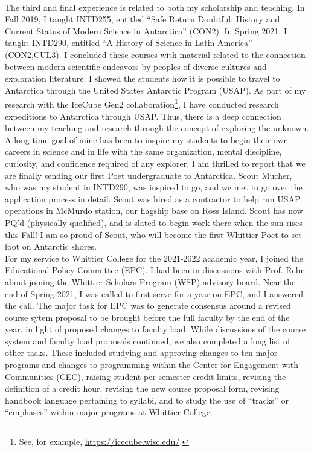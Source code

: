 \documentclass[../../main.tex]{subfiles}
\begin{document}
\\
\vspace{0.25cm}
The third and final experience is related to both my scholarship and teaching.  In Fall 2019, I taught INTD255, entitled ``Safe Return Doubtful: History and Current Status of Modern Science in Antarctica'' (CON2).  In Spring 2021, I taught INTD290, entitled ``A History of Science in Latin America'' (CON2,CUL3).  I concluded these courses with material related to the connection between modern scientific endeavors by peoples of diverse cultures and exploration literature.  I showed the students how it is possible to travel to Antarctica through the United States Antarctic Program (USAP).  As part of my research with the IceCube Gen2 collaboration\footnote{See, for example, \url{https://icecube.wisc.edu/}.}, I have conducted research expeditions to Antarctica through USAP.  Thus, there is a deep connection between my teaching and research through the concept of exploring the unknown.  A long-time goal of mine has been to inspire my students to begin their own careers in science and in life with the same organization, mental discipline, curiosity, and confidence required of any explorer.  I am thrilled to report that we are finally sending our first Poet undergraduate to Antarctica.  Scout Mucher, who was my student in INTD290, was inspired to go, and we met to go over the application process in detail.  Scout was hired as a contractor to help run USAP operations in McMurdo station, our flagship base on Ross Island.  Scout has now PQ'd (physically qualified), and is slated to begin work there when the sun rises this Fall!  I am so proud of Scout, who will become the first Whittier Poet to set foot on Antarctic shores.
\\
\vspace{0.25cm}
For my service to Whittier College for the 2021-2022 academic year, I joined the Educational Policy Committee (EPC).  I had been in discussions with Prof. Rehn about joining the Whittier Scholars Program (WSP) advisory board.  Near the end of Spring 2021, I was called to first serve for a year on EPC, and I answered the call.  The major task for EPC was to generate consensus around a revised course sytem proposal to be brought before the full faculty by the end of the year, in light of proposed changes to faculty load.  While discussions of the course system and faculty load proposals continued, we also completed a long list of other tasks.  These included studying and approving changes to ten major programs and changes to programming within the Center for Engagement with Communities (CEC), raising student per-semester credit limits, revising the definition of a credit hour, revising the new course proposal form, revising handbook language pertaining to syllabi, and to study the use of ``tracks'' or ``emphases'' within major programs at Whittier College.
\end{document}
